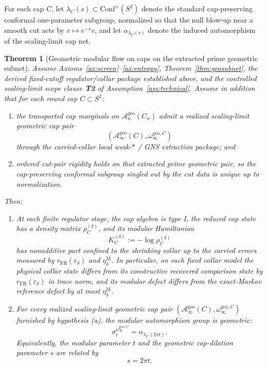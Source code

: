 \documentclass[11pt]{article}
\newtheorem{theorem}{Theorem}[section]
\newcommand{\Conf}{\mathrm{Conf}}
\begin{document}
For each cap \(C\), let \(\lambda_C(s)\subset \Conf^+(S^2)\) denote the standard cap-preserving conformal one-parameter subgroup, normalized so that the null blow-up near a smooth cut acts by \(v\mapsto e^{-s}v\), and let \(\alpha_{\lambda_C(s)}\) denote the induced automorphism of the scaling-limit cap net.

\begin{theorem}[Geometric modular flow on caps on the extracted prime geometric subnet]\label{thm:bw}
Assume Axioms~\ref{ax:screen}--\ref{ax:entropy}, Theorem~\ref{thm:geosubnet}, the derived fixed-cutoff regulator/collar package established above, and the controlled scaling-limit scope clause \textbf{T2} of Assumption~\ref{ass:technical}. Assume in addition that for each round cap \(C\subset S^2\):
\begin{enumerate}[label=\textup{(\alph*)},leftmargin=2em]
\item the transported cap marginals on \(\mathcal A_n^{\mathrm{geo}}(C_n)\) admit a realized scaling-limit geometric cap pair
\[
(\mathcal A_\infty^{\mathrm{geo}}(C),\omega_\infty^{\mathrm{geo},C})
\]
through the carried-collar local weak-\(*\) / GNS extraction package; and
\item ordered cut-pair rigidity holds on that extracted prime geometric pair, so the cap-preserving conformal subgroup singled out by the cut data is unique up to normalization.
\end{enumerate}
Then:
\begin{enumerate}[label=\textup{(\roman*)},leftmargin=2em]
\item At each finite regulator stage, the cap algebra is type I, the reduced cap state has a density matrix \(\rho_C^{(\delta)}\), and its modular Hamiltonian
\[
K_C^{(\delta)}:=-\log \rho_C^{(\delta)}
\]
has nonadditive part confined to the shrinking collar up to the carried errors measured by \(r_{\mathrm{FR}}(\varepsilon_\delta)\) and \(\eta_\delta^{\mathrm M}\). In particular, on each fixed collar model the physical collar state differs from its constructive recovered comparison state by \(r_{\mathrm{FR}}(\varepsilon_\delta)\) in trace norm, and its modular defect differs from the exact-Markov reference defect by at most \(\eta_\delta^{\mathrm M}\).

\item For every realized scaling-limit geometric cap pair \((\mathcal A_\infty^{\mathrm{geo}}(C),\omega_\infty^{\mathrm{geo},C})\) furnished by hypothesis \textup{(a)}, the modular automorphism group is geometric:
\[
\sigma_t^{\omega_\infty^{\mathrm{geo},C}}
=
\alpha_{\lambda_C(2\pi t)}.
\]
Equivalently, the modular parameter \(t\) and the geometric cap-dilation parameter \(s\) are related by
\[
s=2\pi t.
\]


\end{enumerate}
\end{theorem}
\end{document}
